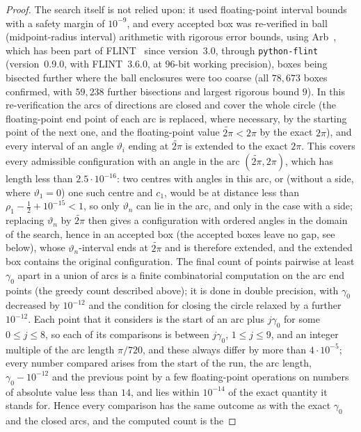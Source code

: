 \documentclass[11pt]{amsart}
\theoremstyle{definition}
\theoremstyle{remark}
\begin{document}
\begin{proof}
The search itself is not relied upon: it used floating-point interval bounds with a safety margin of $10^{-9}$, and every accepted
box was re-verified in ball (midpoint-radius interval) arithmetic with rigorous error bounds, using Arb~\cite{Arb}, which has been part
of FLINT~\cite{FLINT} since version~3.0, through \texttt{python-flint}~\cite{pyflint} (version~0.9.0, with FLINT~3.6.0, at $96$-bit
working precision), boxes being bisected further where the ball enclosures were too coarse (all $78{,}673$ boxes confirmed, with $59{,}238$ further bisections and largest rigorous bound $9$).
In this re-verification the arcs of directions are closed and cover the whole circle (the floating-point end point of each arc is
replaced, where necessary, by the starting point of the next one, and the floating-point value $\widetilde{2\pi}<2\pi$ by the exact
$2\pi$), and every interval of an angle $\vartheta_i$ ending at $\widetilde{2\pi}$ is extended to the exact $2\pi$. This covers every
admissible configuration with an angle in the arc $(\widetilde{2\pi},2\pi)$, which has length less than $2.5\cdot10^{-16}$: two centres
with angles in this arc, or (without a side, where $\vartheta_1=0$) one such centre and $c_1$, would be at distance less than
$\rho_1-\frac12+10^{-15}<1$, so only $\vartheta_n$ can lie in the arc, and only in the case with a side; replacing $\vartheta_n$ by
$\widetilde{2\pi}$ then gives a configuration with ordered angles in the domain of the search, hence in an accepted box (the accepted boxes
leave no gap, see below), whose $\vartheta_n$-interval ends at $\widetilde{2\pi}$ and is therefore extended, and the extended box contains the
original configuration. The final count of
points pairwise at least $\gamma_0$ apart in a union of arcs is a finite combinatorial computation on the arc end points (the greedy
count described above); it is done in double precision, with $\gamma_0$ decreased by $10^{-12}$ and the condition for closing the circle
relaxed by a further $10^{-12}$. Each point that it considers is the start of an arc plus $j\gamma_0$ for some $0\le j\le8$, so each of its
comparisons is between $j\gamma_0$, $1\le j\le9$, and an integer multiple of the arc length $\pi/720$, and these always differ by more
than $4\cdot10^{-5}$; every number compared arises from the start of the run, the arc length, $\gamma_0-10^{-12}$ and the previous
point by a few floating-point operations on numbers of absolute value less than $14$, and lies within $10^{-14}$ of the exact quantity it
stands for. Hence every comparison has the same outcome as with the exact $\gamma_0$ and the closed arcs, and the computed count is the

\end{proof}
\end{document}
